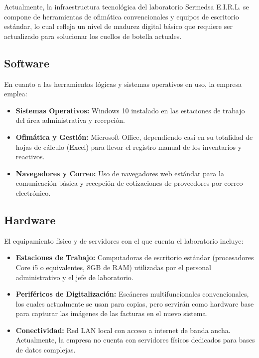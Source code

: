 \documentclass[12pt,a4paper]{article}
\begin{document}
Actualmente, la infraestructura tecnológica del laboratorio Sermedsa E.I.R.L. se compone de herramientas de ofimática convencionales y equipos de escritorio estándar, lo cual refleja un nivel de madurez digital básico que requiere ser actualizado para solucionar los cuellos de botella actuales.

\subsection{Software}
En cuanto a las herramientas lógicas y sistemas operativos en uso, la empresa emplea:
\begin{itemize}
    \item \textbf{Sistemas Operativos:} Windows 10 instalado en las estaciones de trabajo del área administrativa y recepción.
    \item \textbf{Ofimática y Gestión:} Microsoft Office, dependiendo casi en su totalidad de hojas de cálculo (Excel) para llevar el registro manual de los inventarios y reactivos.
    \item \textbf{Navegadores y Correo:} Uso de navegadores web estándar para la comunicación básica y recepción de cotizaciones de proveedores por correo electrónico.
\end{itemize}

\subsection{Hardware}
El equipamiento físico y de servidores con el que cuenta el laboratorio incluye:
\begin{itemize}
    \item \textbf{Estaciones de Trabajo:} Computadoras de escritorio estándar (procesadores Core i5 o equivalentes, 8GB de RAM) utilizadas por el personal administrativo y el jefe de laboratorio.
    \item \textbf{Periféricos de Digitalización:} Escáneres multifuncionales convencionales, los cuales actualmente se usan para copias, pero servirán como hardware base para capturar las imágenes de las facturas en el nuevo sistema.
    \item \textbf{Conectividad:} Red LAN local con acceso a internet de banda ancha. Actualmente, la empresa no cuenta con servidores físicos dedicados para bases de datos complejas.
\end{itemize}
\end{document}
